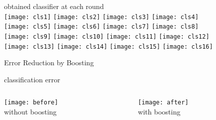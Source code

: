 \documentclass[fleqn,aspectratio=1610]{beamer}
\begin{document}
\begin{frame}[label={sec:org0041fae}]{}
\begin{center}
obtained classifier at each round\\
\texttt{[image: cls1]}
\hspace*{5pt}
\texttt{[image: cls2]}
\hspace*{5pt}
\texttt{[image: cls3]}
\hspace*{5pt}
\texttt{[image: cls4]}
\\
\texttt{[image: cls5]}
\hspace*{5pt}
\texttt{[image: cls6]}
\hspace*{5pt}
\texttt{[image: cls7]}
\hspace*{5pt}
\texttt{[image: cls8]}
\\
\texttt{[image: cls9]}
\hspace*{5pt}
\texttt{[image: cls10]}
\hspace*{5pt}
\texttt{[image: cls11]}
\hspace*{5pt}
\texttt{[image: cls12]}
\\
\texttt{[image: cls13]}
\hspace*{5pt}
\texttt{[image: cls14]}
\hspace*{5pt}
\texttt{[image: cls15]}
\hspace*{5pt}
\texttt{[image: cls16]}
\end{center}
\end{frame}


\begin{frame}[label={sec:org8bf4c13}]{Error Reduction by Boosting}
\begin{center}
classification error
\end{center}
\begin{columns}
\begin{column}{0.5\columnwidth}
\begin{center}
\texttt{[image: before]} \\[0pt]
without boosting
\end{center}
\end{column}
\begin{column}{0.5\columnwidth}
\begin{center}
\texttt{[image: after]} \\[0pt]
with boosting
\end{center}
\end{column}
\end{columns}
\end{frame}
\end{document}
